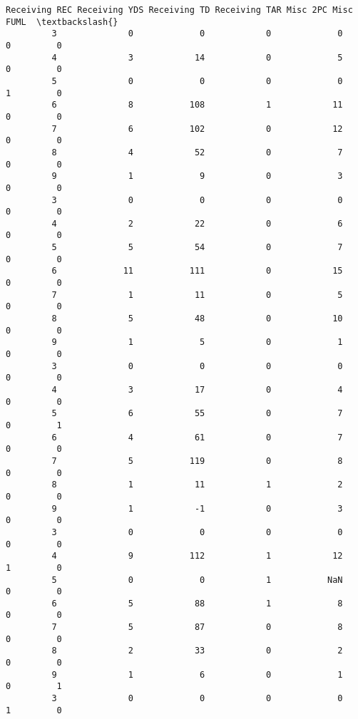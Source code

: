 \documentclass[11pt]{article}
\begin{document}
\begin{Verbatim}[commandchars=\\\{\}]
            Receiving REC Receiving YDS Receiving TD Receiving TAR Misc 2PC Misc FUML  \textbackslash{}
         3              0             0            0             0        0         0   
         4              3            14            0             5        0         0   
         5              0             0            0             0        1         0   
         6              8           108            1            11        0         0   
         7              6           102            0            12        0         0   
         8              4            52            0             7        0         0   
         9              1             9            0             3        0         0   
         3              0             0            0             0        0         0   
         4              2            22            0             6        0         0   
         5              5            54            0             7        0         0   
         6             11           111            0            15        0         0   
         7              1            11            0             5        0         0   
         8              5            48            0            10        0         0   
         9              1             5            0             1        0         0   
         3              0             0            0             0        0         0   
         4              3            17            0             4        0         0   
         5              6            55            0             7        0         1   
         6              4            61            0             7        0         0   
         7              5           119            0             8        0         0   
         8              1            11            1             2        0         0   
         9              1            -1            0             3        0         0   
         3              0             0            0             0        0         0   
         4              9           112            1            12        1         0   
         5              0             0            1           NaN        0         0   
         6              5            88            1             8        0         0   
         7              5            87            0             8        0         0   
         8              2            33            0             2        0         0   
         9              1             6            0             1        0         1   
         3              0             0            0             0        1         0   

\end{Verbatim}
\end{document}
